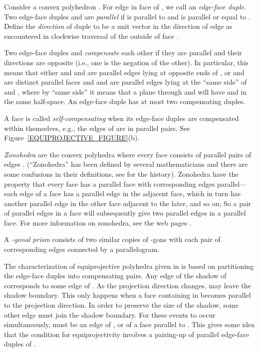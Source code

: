 \documentclass{article}
\begin{document}
Consider a convex polyhedron .
For edge  in face  of , we call  an {\it edge-face duple\/}.
Two edge-face duples  and  are {\it parallel\/}
if  is parallel to  and  is parallel or equal to .
Define the {\it direction\/} of duple  to be
a unit vector in the direction of edge  as encountered 
in clockwise traversal of the outside of face .

Two edge-face duples  and  {\it compensate\/} each other if
they are parallel and 
their directions are opposite (i.e., one is the negation of the other).
In particular, this means that either  and  and  are
parallel edges lying at opposite ends of ,
or  and  are distinct parallel faces and  and  are
parallel edges lying at the ``same side'' of  and ,
where by ``same side'' it means that a plane through  and 
will have  and  in the same half-space. 
An edge-face duple has at most two compensating duples.

A face  is called \emph{self-compensating} when its edge-face duples
are compensated within themselves, e.g., the edges of  are in parallel pairs.
See Figure~\ref{EQUIPROJECTIVE_FIGURE}(b).

\emph{Zonohedra} are the convex polyhedra where every face 
consists of parallel pairs of edges \cite{Tay92}.
(``Zonohedra'' has been defined by several mathematicians 
and there are some confusions in their definitions, 
see \cite{Tay92} for the history).
Zonohedra have the property that every face has a parallel 
face with corresponding edges parallel---each edge of a face has a 
parallel edge in the adjacent face, which in turn has another parallel
edge in the other face adjacent to the later, and so on; 
So a pair of parallel edges in a face 
will subsequently give two parallel edges in a parallel face.
For more information on zonohedra, see the web pages \cite{Epp,Epp96,Har}.

A \emph{-gonal prism} consists of two similar copies of -gons with 
each pair of corresponding edges connected by a parallelogram.



The characterization of equiprojective polyhedra given in \cite{HL03} 
is based on partitioning the edge-face duples into compensating pairs.
Any edge  of the shadow of  corresponds to some edge of .
As the projection direction changes,  may leave the shadow 
boundary.  This only happens when a face  containing  
in  becomes parallel to the projection direction.  
In order to preserve the size of the shadow, some other edge
 must join the shadow boundary.  
For these events to occur simultaneously,  must
be an edge of , or of a face parallel to .
This gives some idea that the condition for equiprojectivity
involves a pairing-up of parallel edge-face duples of .
\end{document}
